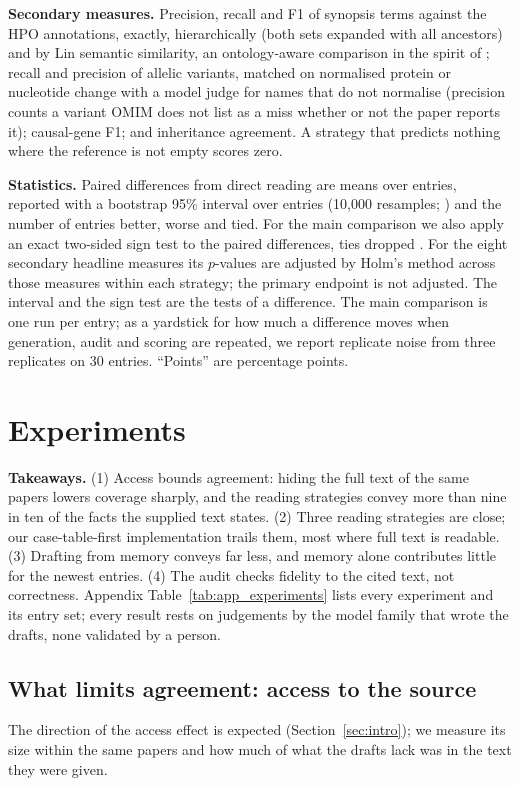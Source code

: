 \documentclass{article} %
\begin{document}
\textbf{Secondary measures.} Precision, recall and F1 of synopsis terms against the HPO annotations, exactly, hierarchically (both sets expanded with all ancestors) and by Lin semantic similarity, an ontology-aware comparison in the spirit of \citet{Khler2009ClinicalDiagnostics}; recall and precision of allelic variants, matched on normalised protein or nucleotide change with a model judge for names that do not normalise (precision counts a variant OMIM does not list as a miss whether or not the paper reports it); causal-gene F1; and inheritance agreement. A strategy that predicts nothing where the reference is not empty scores zero.

\textbf{Statistics.} Paired differences from direct reading are means over entries, reported with a bootstrap 95\% interval over entries (10,000 resamples; \citealp{Efron1979BootstrapMethods}) and the number of entries better, worse and tied. For the main comparison we also apply an exact two-sided sign test to the paired differences, ties dropped \citep{Dixon1946StatisticalSign}. For the eight secondary headline measures its $p$-values are adjusted by Holm's method \citep{holm1979simple} across those measures within each strategy; the primary endpoint is not adjusted. The interval and the sign test are the tests of a difference. The main comparison is one run per entry; as a yardstick for how much a difference moves when generation, audit and scoring are repeated, we report replicate noise from three replicates on 30 entries. ``Points'' are percentage points.

\section{Experiments}
\label{sec:experiments}
\textbf{Takeaways.} (1) Access bounds agreement: hiding the full text of the same papers lowers coverage sharply, and the reading strategies convey more than nine in ten of the facts the supplied text states. (2) Three reading strategies are close; our case-table-first implementation trails them, most where full text is readable. (3) Drafting from memory conveys far less, and memory alone contributes little for the newest entries. (4) The audit checks fidelity to the cited text, not correctness. Appendix Table~\ref{tab:app_experiments} lists every experiment and its entry set; every result rests on judgements by the model family that wrote the drafts, none validated by a person.

\subsection{What limits agreement: access to the source}
\label{sec:access}
The direction of the access effect is expected (Section~\ref{sec:intro}); we measure its size within the same papers and how much of what the drafts lack was in the text they were given.
\end{document}
